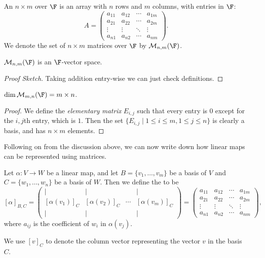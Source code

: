 \documentclass[a4paper]{scrartcl}
\begin{document}
\begin{definition}[Matrix]
    An $n \times m$  over $\F$ is an array with $n$ rows and $m$ columns, with entries in $\F$:
    $$
    A = \begin{pmatrix}
        a_{11} & a_{12} & \cdots & a_{1m} \\
        a_{21} & a_{22} & \cdots & a_{2m} \\
        \vdots&\vdots&\ddots &\vdots\\
        a_{n1} & a_{n2} & \cdots & a_{nm}
    \end{pmatrix}.
    $$
    We denote the set of $n \times m$ matrices over $\F$ by $\mathcal{M}_{n,m}(\F)$.
\end{definition}

\begin{proposition}
    $\mathcal{M}_{n, m}(\F)$ is an $\F$-vector space.
\end{proposition}
\begin{proof}[Proof Sketch]
    Taking addition entry-wise we can just check definitions.
\end{proof}

\begin{proposition}
    $\dim \mathcal{M}_{m, n}(\F) = m \times n$.
\end{proposition}
\begin{proof}
    We define the \emph{elementary matrix} $E_{i, j}$ such that every entry is $0$ except for the $i, j$th entry, which is $1$.
    Then the set $\{E_{i, j} \mid 1 \leq i \leq m, 1 \leq j \leq n\}$ is clearly a basis, and has $n \times m$ elements.
\end{proof}

Following on from the discussion above, we can now write down how linear maps can be represented using matrices.

\begin{definition}
    Let $\alpha: V \rightarrow W$ be a linear map, and let $B = \{v_1, \dots, v_m\}$ be a basis of $V$ and $C = \{w_1, \dots, w_n\}$ be a basis of $W$. Then we define the  to be
    $$
    [\alpha]_{B, C} = \begin{pmatrix}
        | & | & & | \\
        [\alpha(v_1)]_C & [\alpha(v_2)]_C & \cdots & [\alpha(v_m)]_C \\
        | & | & & |
    \end{pmatrix} = \begin{pmatrix}
        a_{11} & a_{12} & \cdots & a_{1m} \\
        a_{21} & a_{22} & \cdots & a_{2m} \\
        \vdots&\vdots&\ddots &\vdots\\
        a_{n1} & a_{n2} & \cdots & a_{nm}
    \end{pmatrix},
    $$
    where $a_{ij}$ is the coefficient of $w_i$ in $\alpha(v_j)$.
\end{definition}
\begin{remark}[Notation]
    We use $[v]_C$ to denote the column vector representing the vector $v$ in the basis $C$.
\end{remark}
\end{document}
